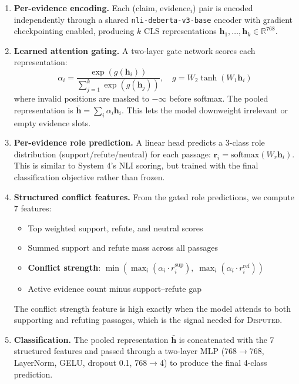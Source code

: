 \documentclass[11pt]{article}
\begin{document}
\begin{enumerate}
  \item \textbf{Per-evidence encoding.}
        Each (claim, evidence$_i$) pair is encoded independently
        through a shared \texttt{nli-deberta-v3-base} encoder with
        gradient checkpointing enabled, producing $k$ CLS
        representations $\mathbf{h}_1, \ldots, \mathbf{h}_k \in
        \mathbb{R}^{768}$.

  \item \textbf{Learned attention gating.}
        A two-layer gate network scores each representation:
        \begin{equation}
          \alpha_i = \frac{\exp(g(\mathbf{h}_i))}
                         {\sum_{j=1}^{k} \exp(g(\mathbf{h}_j))},
          \quad g = W_2 \tanh(W_1 \mathbf{h}_i)
        \end{equation}
        where invalid positions are masked to $-\infty$ before softmax.
        The pooled representation is
        $\bar{\mathbf{h}} = \sum_i \alpha_i \mathbf{h}_i$.
        This lets the model downweight irrelevant or empty evidence
        slots.

  \item \textbf{Per-evidence role prediction.}
        A linear head predicts a 3-class role distribution
        (support/refute/neutral) for each passage:
        $\mathbf{r}_i = \text{softmax}(W_r \mathbf{h}_i)$.
        This is similar to System 4's NLI scoring, but trained
         with the final classification objective rather than
        frozen.

  \item \textbf{Structured conflict features.}
        From the gated role predictions, we compute 7 features:
        \begin{itemize}
          \item Top weighted support, refute, and neutral scores
          \item Summed support and refute mass across all passages
          \item \textbf{Conflict strength}:
                $\min(\max_i(\alpha_i \cdot r_i^{\text{sup}}),\;
                       \max_i(\alpha_i \cdot r_i^{\text{ref}}))$
          \item Active evidence count minus support--refute gap
        \end{itemize}
        The conflict strength feature is high exactly when the model
        attends to both supporting and refuting passages, which is the
        signal needed for \textsc{Disputed}.

  \item \textbf{Classification.}
        The pooled representation $\bar{\mathbf{h}}$ is concatenated
        with the 7 structured features and passed through a two-layer
        MLP (768$\to$768, LayerNorm, GELU, dropout 0.1, 768$\to$4)
        to produce the final 4-class prediction.
\end{enumerate}
\end{document}

